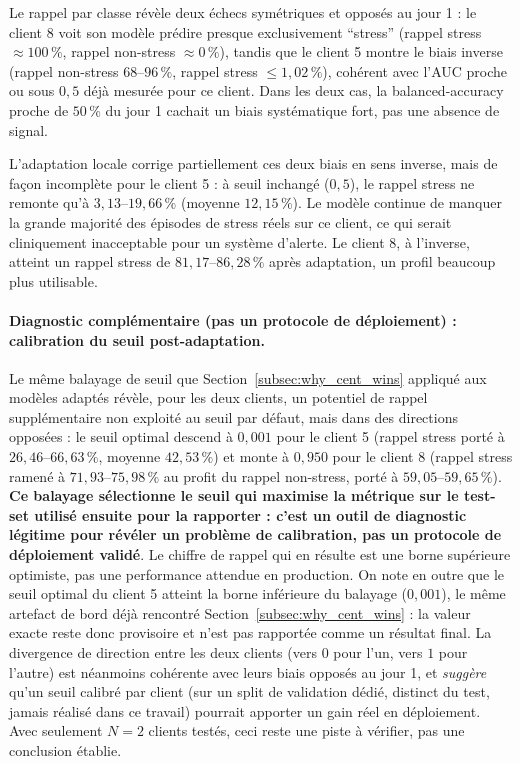 \documentclass{article}
\begin{document}
Le rappel par classe révèle deux échecs symétriques et opposés au jour 1 : le client 8
voit son modèle prédire presque exclusivement ``stress'' (rappel stress
$\approx 100\,\%$, rappel non-stress $\approx 0\,\%$), tandis que le client 5 montre le
biais inverse (rappel non-stress $68$--$96\,\%$, rappel stress $\leq 1{,}02\,\%$),
cohérent avec l'AUC proche ou sous $0{,}5$ déjà mesurée pour ce client. Dans les deux
cas, la balanced-accuracy proche de $50\,\%$ du jour 1 cachait un biais systématique
fort, pas une absence de signal.

L'adaptation locale corrige partiellement ces deux biais en sens inverse, mais de façon
incomplète pour le client 5 : à seuil inchangé ($0{,}5$), le rappel stress ne remonte
qu'à $3{,}13$--$19{,}66\,\%$ (moyenne $12{,}15\,\%$). Le modèle continue de manquer la
grande majorité des épisodes de stress réels sur ce client, ce qui serait cliniquement
inacceptable pour un système d'alerte. Le client 8, à l'inverse, atteint un rappel
stress de $81{,}17$--$86{,}28\,\%$ après adaptation, un profil beaucoup plus utilisable.

\paragraph{Diagnostic complémentaire (pas un protocole de déploiement) : calibration du
seuil post-adaptation.} Le même balayage de seuil que Section~\ref{subsec:why_cent_wins}
appliqué aux modèles adaptés révèle, pour les deux clients, un potentiel de rappel
supplémentaire non exploité au seuil par défaut, mais dans des directions opposées :
le seuil optimal descend à $0{,}001$ pour le client 5 (rappel stress porté à
$26{,}46$--$66{,}63\,\%$, moyenne $42{,}53\,\%$) et monte à $0{,}950$ pour le client 8
(rappel stress ramené à $71{,}93$--$75{,}98\,\%$ au profit du rappel non-stress, porté à
$59{,}05$--$59{,}65\,\%$). \textbf{Ce balayage sélectionne le seuil qui maximise la
métrique sur le test-set utilisé ensuite pour la rapporter : c'est un outil de
diagnostic légitime pour révéler un problème de calibration, pas un protocole de
déploiement validé}. Le chiffre de rappel qui en résulte est une borne supérieure
optimiste, pas une performance attendue en production. On note en outre que le seuil
optimal du client 5 atteint la borne inférieure du balayage ($0{,}001$), le même
artefact de bord déjà rencontré Section~\ref{subsec:why_cent_wins} : la valeur exacte
reste donc provisoire et n'est pas rapportée comme un résultat final. La divergence de
direction entre les deux clients (vers $0$ pour l'un, vers $1$ pour l'autre) est
néanmoins cohérente avec leurs biais opposés au jour 1, et \emph{suggère} qu'un seuil
calibré par client (sur un split de validation dédié, distinct du test, jamais
réalisé dans ce travail) pourrait apporter un gain réel en déploiement. Avec
seulement $N=2$ clients testés, ceci reste une piste à vérifier, pas une conclusion
établie.
\end{document}
